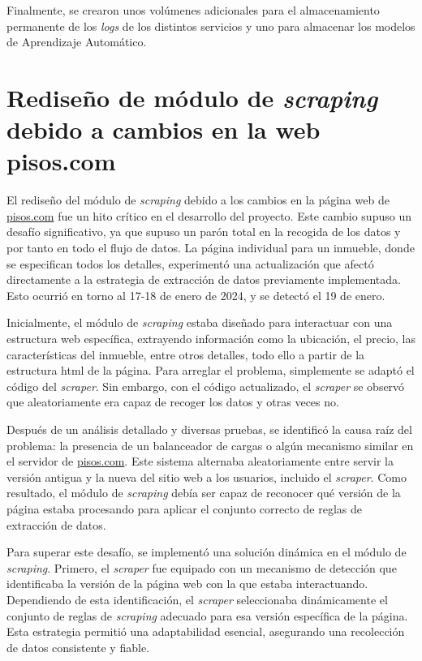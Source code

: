 Finalmente, se crearon unos volúmenes adicionales para el almacenamiento permanente de los \textit{logs} de los distintos servicios y uno para almacenar los modelos de Aprendizaje Automático.

\clearpage
\section{Rediseño de módulo de \textit{scraping} debido a cambios en la web pisos.com}\label{sec:cambio_web}

El rediseño del módulo de \textit{scraping} debido a los cambios en la página web de \url{pisos.com} fue un hito crítico en el desarrollo del proyecto. Este cambio supuso un desafío significativo, ya que supuso un parón total en la recogida de los datos y por tanto en todo el flujo de datos. La página individual para un inmueble, donde se especifican todos los detalles, experimentó una actualización que afectó directamente a la estrategia de extracción de datos previamente implementada. Esto ocurrió en torno al 17-18 de enero de 2024, y se detectó el 19 de enero.

Inicialmente, el módulo de \textit{scraping} estaba diseñado para interactuar con una estructura web específica, extrayendo información como la ubicación, el precio, las características del inmueble, entre otros detalles, todo ello a partir de la estructura html de la página. Para arreglar el problema, simplemente se adaptó el código del \textit{scraper}. Sin embargo, con el código actualizado, el \textit{scraper} se observó que aleatoriamente era capaz de recoger los datos y otras veces no.

Después de un análisis detallado y diversas pruebas, se identificó la causa raíz del problema: la presencia de un balanceador de cargas o algún mecanismo similar en el servidor de \url{pisos.com}. Este sistema alternaba aleatoriamente entre servir la versión antigua y la nueva del sitio web a los usuarios, incluido el \textit{scraper}. Como resultado, el módulo de \textit{scraping} debía ser capaz de reconocer qué versión de la página estaba procesando para aplicar el conjunto correcto de reglas de extracción de datos.

Para superar este desafío, se implementó una solución dinámica en el módulo de \textit{scraping}. Primero, el \textit{scraper} fue equipado con un mecanismo de detección que identificaba la versión de la página web con la que estaba interactuando. Dependiendo de esta identificación, el \textit{scraper} seleccionaba dinámicamente el conjunto de reglas de \textit{scraping} adecuado para esa versión específica de la página. Esta estrategia permitió una adaptabilidad esencial, asegurando una recolección de datos consistente y fiable.

